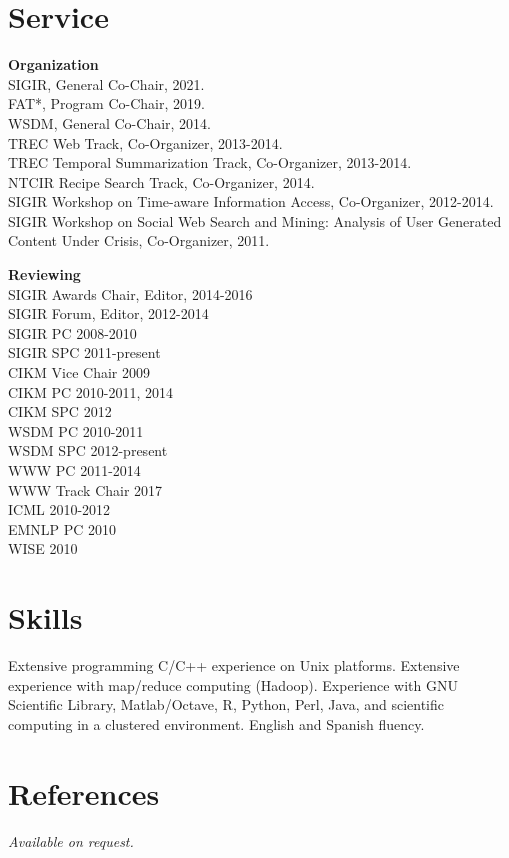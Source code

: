 \documentclass{article}
\begin{document}
\section{Service}\noindent\textbf{Organization}\\
SIGIR, General Co-Chair, 2021.\\
FAT*, Program Co-Chair, 2019.\\
WSDM, General Co-Chair, 2014.\\
TREC Web Track, Co-Organizer, 2013-2014.\\
TREC Temporal Summarization Track, Co-Organizer, 2013-2014.\\
NTCIR Recipe Search Track, Co-Organizer, 2014.\\
SIGIR Workshop on Time-aware Information Access, Co-Organizer, 2012-2014.\\
SIGIR Workshop on Social Web Search and Mining: Analysis of User Generated Content Under Crisis, Co-Organizer, 2011.
	
\vspace{\baselineskip}
\noindent\textbf{Reviewing}\\
SIGIR Awards Chair, Editor, 2014-2016\\
SIGIR Forum, Editor, 2012-2014\\
SIGIR PC 2008-2010\\
SIGIR SPC 2011-present\\
CIKM Vice Chair 2009\\
CIKM PC 2010-2011, 2014\\
CIKM SPC 2012\\
WSDM PC 2010-2011\\
WSDM SPC 2012-present\\
WWW PC 2011-2014\\
WWW Track Chair 2017\\
ICML 2010-2012\\
EMNLP PC 2010\\
WISE 2010






\section{Skills}\noindent Extensive programming C/C++ experience on Unix platforms. Extensive experience with  map/reduce computing (Hadoop).  Experience with GNU Scientific Library, Matlab/Octave, R, Python, Perl, Java, and scientific computing in a clustered environment. English and Spanish fluency.



\section{References}\noindent \emph{Available on request.}

\end{document}
